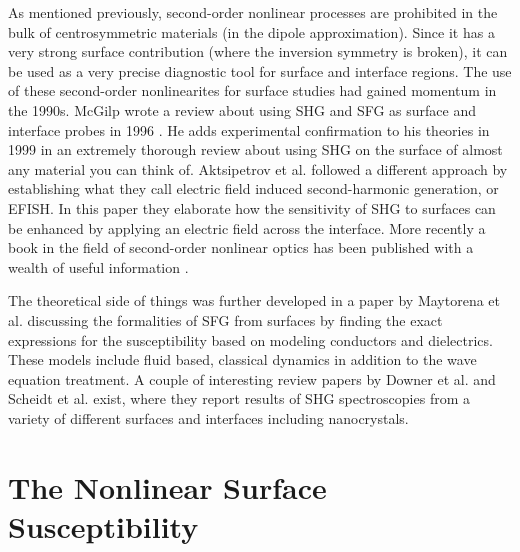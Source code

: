 As mentioned previously, second-order nonlinear processes are prohibited in the
bulk of centrosymmetric materials (in the dipole approximation). Since it has a
very strong surface contribution (where the inversion symmetry is broken), it
can be used as a very precise diagnostic tool for surface and interface regions.
The use of these second-order nonlinearites for surface studies had gained
momentum in the 1990s. McGilp wrote a review about using SHG and SFG as surface
and interface probes in 1996 \cite{mcgilp1996review}. He adds experimental
confirmation to his theories in 1999 \cite{mcgilp1999second} in an extremely
thorough review about using SHG on the surface of almost any material you can
think of. Aktsipetrov et al. \cite{aktsipetrov1997dc} followed a different
approach by establishing what they call electric field induced second-harmonic
generation, or EFISH. In this paper they elaborate how the sensitivity of SHG to
surfaces can be enhanced by applying an electric field across the interface.
More recently a book in the field of second-order nonlinear optics has been
published with a wealth of useful information \cite{aktsipetrovbook}.

The theoretical side of things was further developed in a paper by Maytorena et
al. \cite{PhysRevB.57.2569} discussing the formalities of SFG from surfaces by
finding the exact expressions for the susceptibility based on modeling
conductors and dielectrics. These models include fluid based, classical dynamics
in addition to the wave equation treatment. A couple of interesting review
papers by Downer et al. \cite{downer2001optical} and Scheidt et al.
\cite{scheidt2004optical} exist, where they report results of SHG spectroscopies
from a variety of different surfaces and interfaces including nanocrystals.



\section{The Nonlinear Surface Susceptibility}\label{sec:introchi2}

